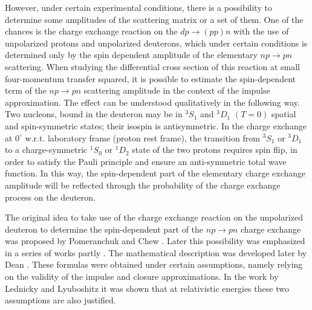 \documentclass[twocolumn,epjc3]{svjour3}
\newcommand{\np}     {\ensuremath{np \rightarrow pn}\xspace}
\newcommand{\dpchex} {\ensuremath{dp \rightarrow (pp)n}\xspace}
\begin{document}
However, under certain experimental conditions, there is a possibility to
determine some amplitudes of the scattering matrix or a set of them. One of the
chances is the charge exchange reaction on the \dpchex with the use of
unpolarized protons and unpolarized deuterons, which under certain conditions is
determined only by the spin dependent amplitude of the elementary \np
scattering. When studying the differential cross section of this reaction at
small four-momentum transfer squared, it is possible to estimate the
spin-dependent term of the \np scattering amplitude in the context of the
impulse approximation. The effect can be understood qualitatively in the
following way. Two nucleons, bound in the deuteron may be in $^3S_1$ and $^3D_1$
$(T = 0)$ spatial and spin-symmetric states; their isospin is antisymmetric. In
the charge exchange at $0^\circ$ w.r.t. laboratory frame (proton rest frame),
the transition from $^3S_1$ or $^3D_1$ to a charge-symmetric $^1S_0$ or $^1D_2$
state of the two protons requires spin flip, in order to satisfy the Pauli
principle and ensure an anti-symmetric total wave function. In this way, the
spin-dependent part of the elementary charge exchange amplitude will be
reflected through the probability of the charge exchange process on the
deuteron.

The original idea to take use of the charge exchange reaction on the unpolarized
deuteron to determine the spin-dependent part of the \np charge exchange was
proposed by Pomeranchuk \cite{pom51} and Chew \cite{chew51}. Later this
possibility was emphasized in a series of works partly
\cite{mig55,pom51_2,lap57,dea72,dea72_2,ala75,ala75_2,bug87}. The mathematical
description was developed later by Dean \cite{dea72,dea72_2}. These formulas
were obtained under certain assumptions, namely relying on the validity of the
impulse and closure approximations. In the work by Lednicky and Lyuboshitz
\cite{led04} it was shown that at relativistic energies these two assumptions
are also justified.
\end{document}
